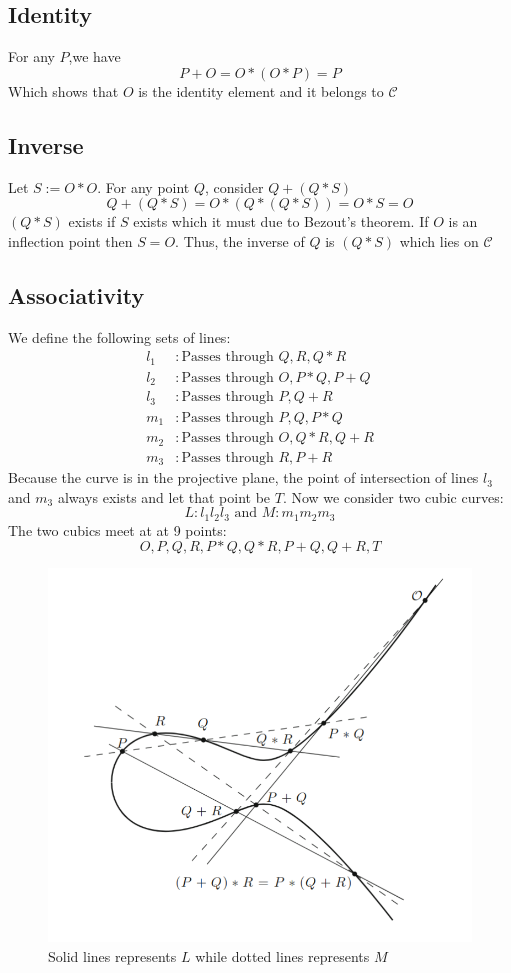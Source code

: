\documentclass{report}
\begin{document}
  \subsection*{Identity}
  For any $P$,we have
  \[P+O = O*(O*P) = P\]
  Which shows that $O$ is the identity element and it belongs to $\mathcal{C}$
  
  \subsection*{Inverse}
  Let $S:=O*O$.
  For any point $Q$, consider $Q+(Q*S)$
  \[Q+(Q*S) = O*(Q*(Q*S)) = O*S = O\]
  $(Q*S)$ exists if $S$ exists which it must due to Bezout's theorem.
  If $O$ is an inflection point then $S = O$.
  Thus, the inverse of $Q$ is $(Q*S)$ which lies on $\mathcal{C}$

  \subsection*{Associativity}
  We define the following sets of lines:
  \begin{align*}
    l_1 &: \text{Passes through }Q,R,Q*R \\
    l_2 &: \text{Passes through }O,P*Q,P+Q \\
    l_3 &: \text{Passes through }P,Q+R \\
    m_1 &: \text{Passes through }P,Q,P*Q \\
    m_2 &: \text{Passes through }O,Q*R,Q+R \\
    m_3 &: \text{Passes through }R,P+R
  \end{align*}
  Because the curve is in the projective plane, the point of intersection of lines $l_3$ and $m_3$ always exists and let that point be $T$.
  Now we consider two cubic curves:
  \[L:l_1 l_2 l_3 \text{ and } M:m_1m_2m_3\]
  The two cubics meet at at 9 points:
  \[O,P,Q,R,P*Q,Q*R,P+Q,Q+R,T\]
  \begin{figure}[H]
    \centering
    \includegraphics[width=0.7\linewidth]{Associativity.png}
    \caption{Solid lines represents $L$ while dotted lines represents $M$}
  \end{figure}
\end{document}
